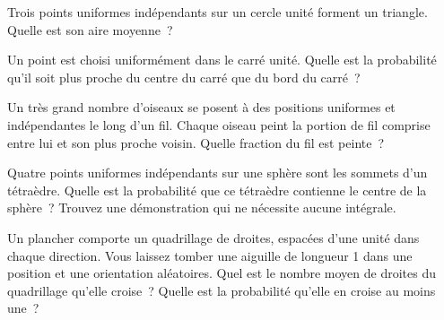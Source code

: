 \begin{question}\label{iq:iv1:continuous-and-geometric-probability:21}
Trois points uniformes indépendants sur un cercle unité forment un triangle. Quelle est son aire moyenne~?
\end{question}

\begin{question}\label{iq:iv1:continuous-and-geometric-probability:22}
Un point est choisi uniformément dans le carré unité. Quelle est la probabilité qu'il soit plus proche du centre du carré que du bord du carré~?
\end{question}

\begin{question}\label{iq:iv1:continuous-and-geometric-probability:23}
Un très grand nombre d'oiseaux se posent à des positions uniformes et indépendantes le long d'un fil. Chaque oiseau peint la portion de fil comprise entre lui et son plus proche voisin. Quelle fraction du fil est peinte~?
\end{question}

\begin{question}\label{iq:iv1:continuous-and-geometric-probability:24}
Quatre points uniformes indépendants sur une sphère sont les sommets d'un tétraèdre. Quelle est la probabilité que ce tétraèdre contienne le centre de la sphère~? Trouvez une démonstration qui ne nécessite aucune intégrale.
\end{question}

\begin{question}\label{iq:iv1:continuous-and-geometric-probability:25}
Un plancher comporte un quadrillage de droites, espacées d'une unité dans chaque direction. Vous laissez tomber une aiguille de longueur 1 dans une position et une orientation aléatoires. Quel est le nombre moyen de droites du quadrillage qu'elle croise~? Quelle est la probabilité qu'elle en croise au moins une~?
\end{question}
